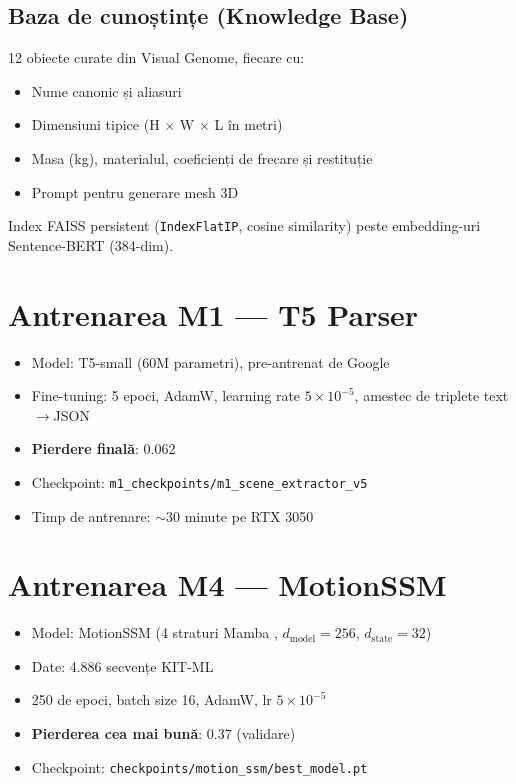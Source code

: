 \subsection{Baza de cunoștințe (Knowledge Base)}

12 obiecte curate din Visual Genome, fiecare cu:
\begin{itemize}
    \item Nume canonic și aliasuri
    \item Dimensiuni tipice (H $\times$ W $\times$ L în metri)
    \item Masa (kg), materialul, coeficienți de frecare și restituție
    \item Prompt pentru generare mesh 3D
\end{itemize}

Index FAISS persistent (\texttt{IndexFlatIP}, cosine similarity) peste embedding-uri Sentence-BERT (384-dim).

\section{Antrenarea M1 --- T5 Parser}

\begin{itemize}
    \item Model: T5-small \cite{raffel2020t5} (60M parametri), pre-antrenat de Google
    \item Fine-tuning: 5 epoci, AdamW, learning rate $5 \times 10^{-5}$, amestec de triplete text$\rightarrow$JSON
    \item \textbf{Pierdere finală}: 0.062
    \item Checkpoint: \texttt{m1\_checkpoints/m1\_scene\_extractor\_v5}
    \item Timp de antrenare: $\sim$30 minute pe RTX 3050
\end{itemize}

\section{Antrenarea M4 --- MotionSSM}

\begin{itemize}
    \item Model: MotionSSM (4 straturi Mamba \cite{gu2023mamba}, $d_{\text{model}} = 256$, $d_{\text{state}} = 32$)
    \item Date: 4.886 secvențe KIT-ML
    \item 250 de epoci, batch size 16, AdamW, lr $5 \times 10^{-5}$
    \item \textbf{Pierderea cea mai bună}: 0.37 (validare)
    \item Checkpoint: \texttt{checkpoints/motion\_ssm/best\_model.pt}
\end{itemize}

